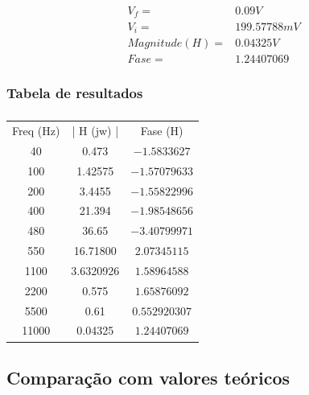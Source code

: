 \documentclass[12pt,twoside, a4paper, twocolumn]{article}
\begin{document}
\begin{equation*}
    \begin{aligned}
         & V_f =          & 0.09V       \\
         & V_i =          & 199.57788mV \\
         & Magnitude(H) = & 0.04325V    \\
         & Fase =         & 1.24407069
    \end{aligned}
\end{equation*}




\subsubsection{Tabela de resultados}




\subparagraph*{}




\begin{center}
    \begin{tabular}{ |c|c|c| }
        \hline
        Freq (Hz) & | H (jw) | & Fase (H)      \\
        40        & 0.473      & $-1.5833627$  \\
        100       & 1.42575    & $-1.57079633$ \\
        200       & 3.4455     & $-1.55822996$ \\
        400       & 21.394     & $-1.98548656$ \\
        480       & 36.65      & $-3.40799971$ \\
        550       & 16.71800   & $2.07345115$  \\
        1100      & 3.6320926  & $ 1.58964588$ \\
        2200      & 0.575      & $1.65876092$  \\
        5500      & 0.61       & $0.552920307$ \\
        11000     & 0.04325    & $1.24407069$  \\
        \hline
    \end{tabular}
\end{center}




\subsection{Comparação com valores teóricos}
\end{document}
